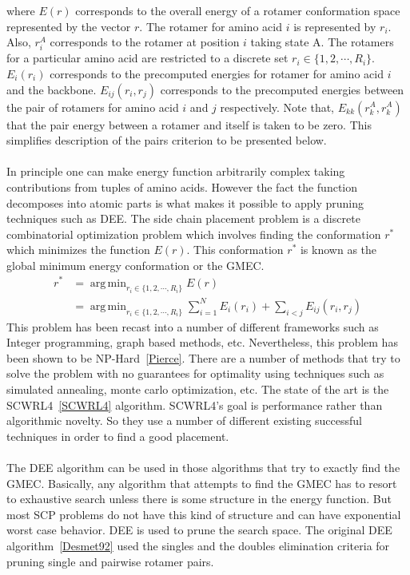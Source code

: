\documentclass[a4]{article}
\DeclareMathOperator*{\argmin}{arg\,min}
\begin{document}
where $E(r)$ corresponds to the overall energy of a rotamer conformation space represented by the vector $r$. The rotamer for amino acid $i$ is represented by $r_i$. Also, $r_i^A$ corresponds to the rotamer at position $i$ taking state A. The rotamers for a particular amino acid are restricted to a discrete set $r_i \in \{1,2,\cdots,R_i\}$. $E_i(r_i)$ corresponds to the precomputed energies for rotamer for amino acid $i$ and the backbone. $E_{ij}(r_i,r_j)$ corresponds to the precomputed energies between the pair of rotamers for amino acid $i$ and $j$ respectively. 
Note that, $E_{kk}(r_k^A,r_k^A)$ that the pair energy between a rotamer and itself is taken to be zero. This simplifies description of the pairs criterion to be presented below. 
\\
\\
In principle one can make energy function arbitrarily complex taking contributions from tuples of amino acids. However the fact the function decomposes into atomic parts is what makes it possible to apply pruning techniques such as DEE.  The side chain placement problem is a discrete combinatorial optimization problem which involves finding the conformation $r^*$ which minimizes the function $E(r)$. This conformation $r^*$ is known as the global minimum energy conformation or the GMEC.
\[
\begin{split}
r^* &= \argmin_{r_i \in \{1,2,\cdots,R_i\}} E(r) \\
&= \argmin_{r_i \in \{1,2,\cdots,R_i\}} \sum_{i=1}^{N}E_i(r_i) + \sum_{i<j}E_{ij}(r_i,r_j)
\end{split}
\]
This problem has been recast into a number of different frameworks such as Integer programming, graph based methods, etc. Nevertheless, this problem has been shown to be NP-Hard~\ref{Pierce}. There are a number of methods that try to solve the problem with no guarantees for optimality using techniques such as simulated annealing, monte carlo optimization, etc.  The state of the art is the SCWRL4~\ref{SCWRL4} algorithm. SCWRL4's goal is performance rather than algorithmic novelty. So they use a number of different existing successful techniques in order to find a good placement. 
\\
\\
The DEE algorithm can be used in those algorithms that try to exactly find the GMEC. Basically, any algorithm that attempts to find the GMEC has to resort to exhaustive search unless there is some structure in the energy function. But most SCP problems do not have this kind of structure and can have exponential worst case behavior. DEE is used to prune the search space. The original DEE algorithm~\ref{Desmet92} used the singles and the doubles elimination criteria for pruning single and pairwise rotamer pairs. 
\end{document}
